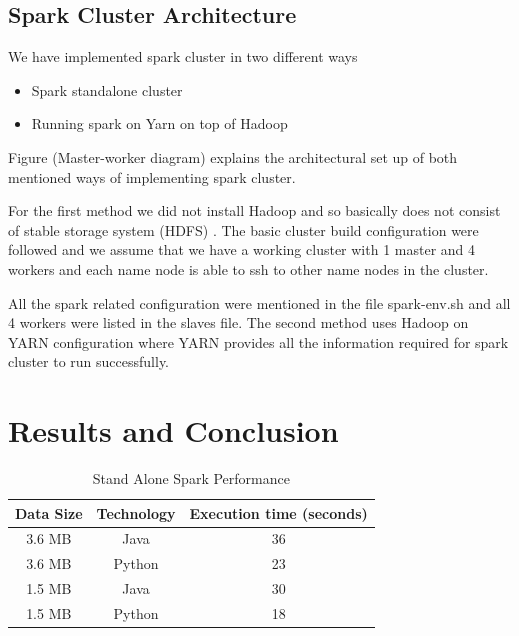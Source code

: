 \subsection{Spark Cluster Architecture}

We have implemented spark cluster in two different ways

\begin{itemize}

\item Spark standalone cluster
\item Running spark on Yarn on top of Hadoop

\end{itemize}

Figure (Master-worker diagram) explains the architectural set up of both 
mentioned ways of implementing spark cluster.

For the first method we did not install Hadoop and so basically does not consist
 of stable storage system (HDFS) . The basic cluster build configuration were 
 followed and we assume that we have a working cluster with 1 master and 4 
 workers and each name node is able to ssh to other name nodes in the cluster. 

All the spark related configuration were mentioned in the file spark-env.sh and 
all 4 workers were listed in the slaves file.
The second method uses Hadoop on YARN configuration where YARN provides all the 
information required for spark cluster to run successfully.






\section{Results and Conclusion}


% 


\begin{table}[hbt]
\centering
\caption{Stand Alone Spark Performance}\label{t:results-table}
    \begin{tabular}{ | c | c | c |}
    \hline
    Data Size & Technology & Execution time (seconds) \\ \hline
    3.6 MB & Java & 36 \\ \hline
    3.6 MB & Python & 23\\ \hline
    1.5 MB & Java & 30 \\ \hline
    1.5 MB & Python & 18 \\
    \hline
    \end{tabular}
\end{table}


